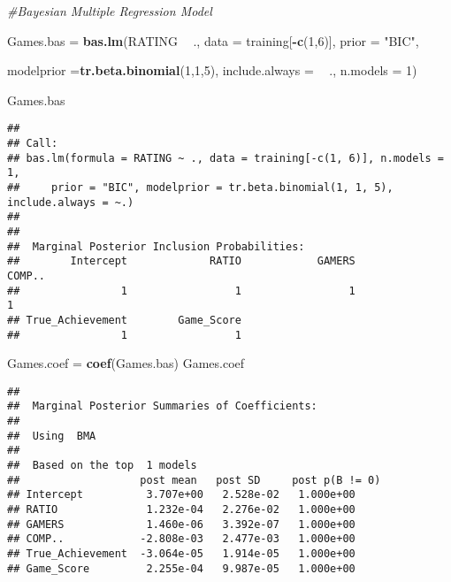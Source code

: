 \documentclass[
]{article}
\newenvironment{Shaded}{\begin{snugshade}}{\end{snugshade}}
\newcommand{\CommentTok}[1]{\textcolor[rgb]{0.56,0.35,0.01}{\textit{#1}}}
\newcommand{\DataTypeTok}[1]{\textcolor[rgb]{0.13,0.29,0.53}{#1}}
\newcommand{\DecValTok}[1]{\textcolor[rgb]{0.00,0.00,0.81}{#1}}
\newcommand{\KeywordTok}[1]{\textcolor[rgb]{0.13,0.29,0.53}{\textbf{#1}}}
\newcommand{\NormalTok}[1]{#1}
\newcommand{\OperatorTok}[1]{\textcolor[rgb]{0.81,0.36,0.00}{\textbf{#1}}}
\newcommand{\StringTok}[1]{\textcolor[rgb]{0.31,0.60,0.02}{#1}}
\begin{document}
\begin{Shaded}
\begin{Highlighting}[]
\CommentTok{#Bayesian Multiple Regression Model}

\NormalTok{Games.bas =}\StringTok{ }\KeywordTok{bas.lm}\NormalTok{(RATING }\OperatorTok{~}\StringTok{ }\NormalTok{., }\DataTypeTok{data =}\NormalTok{ training[}\OperatorTok{-}\KeywordTok{c}\NormalTok{(}\DecValTok{1}\NormalTok{,}\DecValTok{6}\NormalTok{)], }\DataTypeTok{prior =} \StringTok{"BIC"}\NormalTok{,}

\DataTypeTok{modelprior =}\KeywordTok{tr.beta.binomial}\NormalTok{(}\DecValTok{1}\NormalTok{,}\DecValTok{1}\NormalTok{,}\DecValTok{5}\NormalTok{),}
\DataTypeTok{include.always =} \OperatorTok{~}\StringTok{ }\NormalTok{.,}
\DataTypeTok{n.models =} \DecValTok{1}\NormalTok{)}

\NormalTok{Games.bas}
\end{Highlighting}
\end{Shaded}

\begin{verbatim}
## 
## Call:
## bas.lm(formula = RATING ~ ., data = training[-c(1, 6)], n.models = 1, 
##     prior = "BIC", modelprior = tr.beta.binomial(1, 1, 5), include.always = ~.)
## 
## 
##  Marginal Posterior Inclusion Probabilities: 
##        Intercept             RATIO            GAMERS            COMP..  
##                1                 1                 1                 1  
## True_Achievement        Game_Score  
##                1                 1
\end{verbatim}

\begin{Shaded}
\begin{Highlighting}[]
\NormalTok{Games.coef =}\StringTok{ }\KeywordTok{coef}\NormalTok{(Games.bas)}
\NormalTok{Games.coef}
\end{Highlighting}
\end{Shaded}

\begin{verbatim}
## 
##  Marginal Posterior Summaries of Coefficients: 
## 
##  Using  BMA 
## 
##  Based on the top  1 models 
##                   post mean   post SD     post p(B != 0)
## Intercept          3.707e+00   2.528e-02   1.000e+00    
## RATIO              1.232e-04   2.276e-02   1.000e+00    
## GAMERS             1.460e-06   3.392e-07   1.000e+00    
## COMP..            -2.808e-03   2.477e-03   1.000e+00    
## True_Achievement  -3.064e-05   1.914e-05   1.000e+00    
## Game_Score         2.255e-04   9.987e-05   1.000e+00
\end{verbatim}
\end{document}
